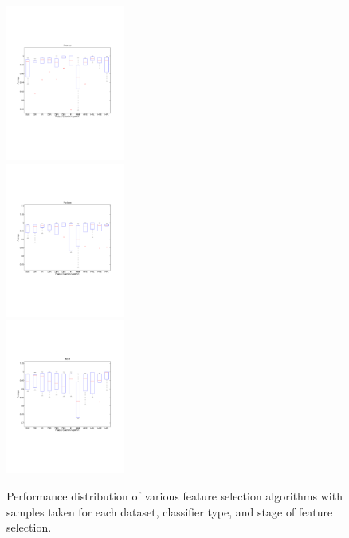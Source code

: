 \begin{figure}[tbp!]
\centering
\includegraphics[width=0.35\textwidth]{../ResultsPlot/BoxPlot/BoxPlot1/Accuracy.pdf}\\
\includegraphics[width=0.35\textwidth]{../ResultsPlot/BoxPlot/BoxPlot1/Precision.pdf}\\
\includegraphics[width=0.35\textwidth]{../ResultsPlot/BoxPlot/BoxPlot1/Recall.pdf}
\caption{\footnotesize Performance distribution of various feature selection algorithms with samples taken for each dataset, classifier type, and stage of feature selection.}
\label{fig:perf_vs_fs_alg}
\end{figure}

